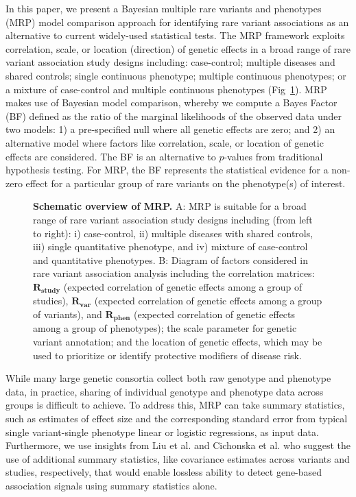 In this paper, we present a Bayesian multiple rare variants and phenotypes (MRP) model comparison approach for identifying rare variant associations as an alternative to current widely-used statistical tests. The MRP framework exploits correlation, scale, or location (direction) of genetic effects in a broad range of rare variant association study designs including: case-control; multiple diseases and shared controls; single continuous phenotype; multiple continuous phenotypes; or a mixture of case-control and multiple continuous phenotypes (Fig~\ref{overview}). MRP makes use of Bayesian model comparison, whereby we compute a Bayes Factor (BF) defined as the ratio of the marginal likelihoods of the observed data under two models: 1) a pre-specified null where all genetic effects are zero; and 2) an alternative model where factors like correlation, scale, or location of genetic effects are considered. The BF is an alternative to $p$-values from traditional hypothesis testing. For MRP, the BF represents the statistical evidence for a non-zero effect for a particular group of rare variants on the phenotype(s) of interest.

\begin{figure}[!h]
\caption{{\bf Schematic overview of MRP.}
A: MRP is suitable for a broad range of rare variant association study designs including (from left to right): i) case-control, ii) multiple diseases with shared controls, iii) single quantitative phenotype, and iv) mixture of case-control and quantitative phenotypes. B: Diagram of factors considered in rare variant association analysis including the correlation matrices: $\mathbf{R_{\textrm{study}}}$  (expected correlation of genetic effects among a group of studies), $\mathbf{R_{\textrm{var}}}$ (expected correlation of genetic effects among a group of variants), and $\mathbf{R_{\textrm{phen}}}$ (expected correlation of genetic effects among a group of phenotypes); the scale parameter for genetic variant annotation; and the location of genetic effects, which may be used to prioritize or identify protective modifiers of disease risk.}
\label{overview}
\end{figure}

While many large genetic consortia collect both raw genotype and phenotype data, in practice, sharing of individual genotype and phenotype data across groups is difficult to achieve. To address this, MRP can take summary statistics, such as estimates of effect size and the corresponding standard error from typical single variant-single phenotype linear or logistic regressions, as input data. Furthermore, we use insights from Liu et al.\cite{liu2014meta} and Cichonska et al.\cite{cichonska2016metacca} who suggest the use of additional summary statistics, like covariance estimates across variants and studies, respectively, that would enable lossless ability to detect gene-based association signals using summary statistics alone.  

